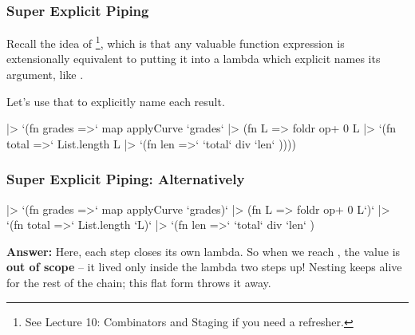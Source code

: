 \documentclass[aspectratio=169]{beamer}
\begin{document}
\begin{frame}[fragile]
  \frametitle{Super Explicit Piping}

  Recall the idea of \footnote{
    See Lecture 10: Combinators and Staging if you need a refresher.
  }, which is that any valuable
  function expression  is extensionally equivalent to putting it
  into a lambda which explicit names its argument, like .

  \pause
  \vspace{\fill}

  Let's use that to explicitly name each result.

  \pause
  \vspace{\fill}

  \begin{codeblock}
    [1, 2, 3]
    |> `(fn grades =>` map applyCurve `grades`
    |> (fn L =>   foldr op+ 0 L
    |> `(fn total =>`  List.length L
    |> `(fn len =>`    `total` div `len` ))))
  \end{codeblock}
\end{frame}

\begin{frame}[fragile]
  \frametitle{Super Explicit Piping: Alternatively}


  \pause
  \vspace{\fill}

  \begin{codeblock}
    [1, 2, 3]
    |> `(fn grades =>` map applyCurve `grades)`
    |> (fn L =>      foldr op+ 0 L`)`
    |> `(fn total =>`  List.length `L)`
    |> `(fn len =>`    `total` div `len` )
  \end{codeblock}

  \pause
  \vspace{\fill}

  \textbf{Answer:} Here, each step closes its own lambda. So when we reach
  , the value  is \textbf{out of scope}
  -- it lived only inside the lambda two steps up! Nesting keeps 
  alive for the rest of the chain; this flat form throws it away.
\end{frame}
\end{document}
